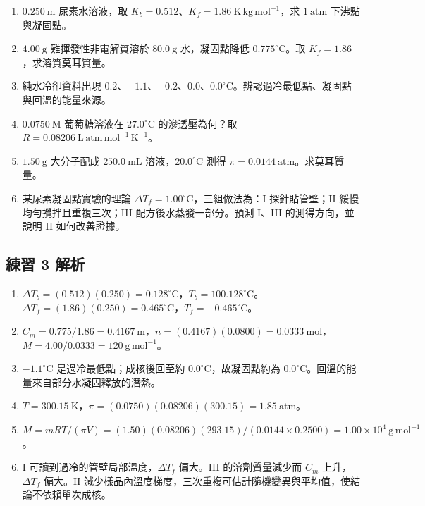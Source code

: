 \documentclass[11pt,a4paper]{article}
\providecommand{\tightlist}{%
  \setlength{\itemsep}{0pt}\setlength{\parskip}{0pt}}
\begin{document}
\begin{enumerate}
\def\labelenumi{\arabic{enumi}.}
\tightlist
\item
  \(0.250\ \mathrm m\) 尿素水溶液，取 \(K_b=0.512\)、\(K_f=1.86\ \mathrm{K\,kg\,mol^{-1}}\)，求 \(1\ \mathrm{atm}\) 下沸點與凝固點。
\item
  \(4.00\ \mathrm g\) 難揮發性非電解質溶於 \(80.0\ \mathrm g\) 水，凝固點降低 \(0.775^\circ\mathrm C\)。取 \(K_f=1.86\)，求溶質莫耳質量。
\item
  純水冷卻資料出現 \(0.2\)、\(-1.1\)、\(-0.2\)、\(0.0\)、\(0.0^\circ\mathrm C\)。辨認過冷最低點、凝固點與回溫的能量來源。
\item
  \(0.0750\ \mathrm M\) 葡萄糖溶液在 \(27.0^\circ\mathrm C\) 的滲透壓為何？取 \(R=0.08206\ \mathrm{L\,atm\,mol^{-1}\,K^{-1}}\)。
\item
  \(1.50\ \mathrm g\) 大分子配成 \(250.0\ \mathrm{mL}\) 溶液，\(20.0^\circ\mathrm C\) 測得 \(\pi=0.0144\ \mathrm{atm}\)。求莫耳質量。
\item
  某尿素凝固點實驗的理論 \(\Delta T_f=1.00^\circ\mathrm C\)，三組做法為：I 探針貼管壁；II 緩慢均勻攪拌且重複三次；III 配方後水蒸發一部分。預測 I、III 的測得方向，並說明 II 如何改善證據。
\end{enumerate}

\subsection{練習 3 解析}\label{ux7df4ux7fd2-3-ux89e3ux6790}

\begin{enumerate}
\def\labelenumi{\arabic{enumi}.}
\tightlist
\item
  \(\Delta T_b=(0.512)(0.250)=0.128^\circ\mathrm C\)，\(T_b=100.128^\circ\mathrm C\)。\(\Delta T_f=(1.86)(0.250)=0.465^\circ\mathrm C\)，\(T_f=-0.465^\circ\mathrm C\)。
\item
  \(C_m=0.775/1.86=0.4167\ \mathrm m\)，\(n=(0.4167)(0.0800)=0.0333\ \mathrm{mol}\)，\(M=4.00/0.0333=120\ \mathrm{g\,mol^{-1}}\)。
\item
  \(-1.1^\circ\mathrm C\) 是過冷最低點；成核後回至約 \(0.0^\circ\mathrm C\)，故凝固點約為 \(0.0^\circ\mathrm C\)。回溫的能量來自部分水凝固釋放的潛熱。
\item
  \(T=300.15\ \mathrm K\)，\(\pi=(0.0750)(0.08206)(300.15)=1.85\ \mathrm{atm}\)。
\item
  \(M=mRT/(\pi V)=(1.50)(0.08206)(293.15)/(0.0144\times0.2500)=1.00\times10^4\ \mathrm{g\,mol^{-1}}\)。
\item
  I 可讀到過冷的管壁局部溫度，\(\Delta T_f\) 偏大。III 的溶劑質量減少而 \(C_m\) 上升，\(\Delta T_f\) 偏大。II 減少樣品內溫度梯度，三次重複可估計隨機變異與平均值，使結論不依賴單次成核。
\end{enumerate}
\end{document}
